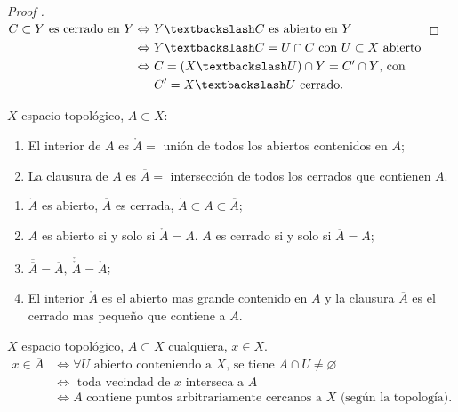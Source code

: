 \documentclass[a4paper]{report}
\begin{document}
	\begin{proof}[Proof ]
		$\begin{aligned}[t]
			C \subset Y \text{ es cerrado en } Y \iff \ & Y \textbackslash C \text{ es abierto en } Y \\
			\iff \ & Y \textbackslash C = U \cap C \text{ con } U \subset X \text{ abierto} \\
			\iff \ & C = (X \textbackslash U) \cap Y = C' \cap Y \text{, con } \\
			& C' = X \textbackslash U \text{ cerrado}
		.\end{aligned}$
	\end{proof}

	\begin{definition}
		$X$ espacio topológico, $A \subset X$:
		\begin{enumerate}
			\item El interior de $A$ es $\mathring{A} =$ unión de todos los abiertos contenidos en $A$;

			\item La clausura de $A$ es $\overline{A} =$ intersección de todos los cerrados que contienen $A$.
		\end{enumerate}
	\end{definition}

	\begin{remark}
		\text{ }
		\begin{enumerate}
			\item $\mathring{A}$ es abierto, $\overline{A}$ es cerrada, $\mathring{A} \subset A \subset \overline{A}$;

			\item $A$ es abierto si y solo si $\mathring{A} = A$. $A$ es cerrado si y solo si $\overline{A} = A$;

			\item $\overline{\overline{A}} = \overline{A}, \ \mathring{\mathring{A}} = \mathring{A}$;

			\item El interior $\mathring{A}$ es el abierto mas grande contenido en $A$ y la clausura $\overline{A}$ es el cerrado mas pequeño que contiene a $A$.
		\end{enumerate}
	\end{remark}

	\begin{prop}
		$X$ espacio topológico, $A \subset X$ cualquiera, $x \in X$.
		\begin{align*}
			x \in \overline{A} & \iff \forall U \text{ abierto conteniendo a } X \text{, se tiene } A \cap U \neq \varnothing \tag*{($*$)} \\
			& \iff \text{ toda vecindad de } x \text{ interseca a } A \\
			& \iff A \text{ contiene puntos arbitrariamente cercanos a } X \text{ (según la topología)}
		.\end{align*}
	\end{prop}
\end{document}
